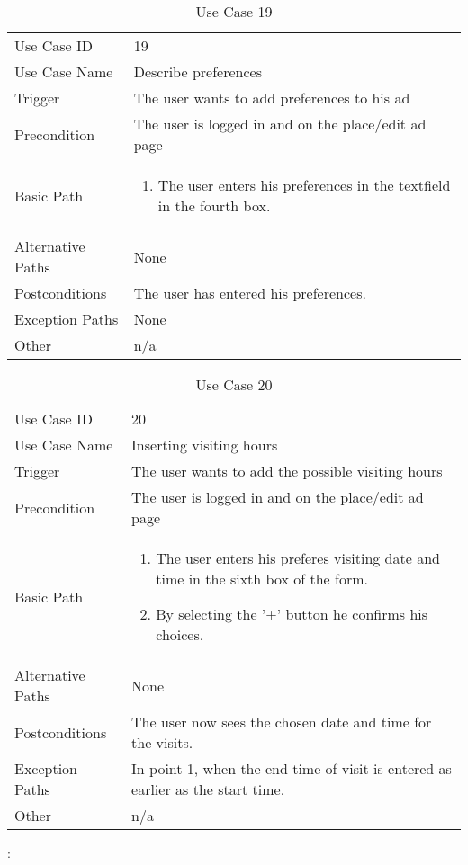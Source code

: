 \begin{table}[H]
\centering
\label{table-use-case-19}
\begin{tabular}{|p{3cm}|p{10cm}}
Use Case ID       & 19                                                      \\
Use Case Name     & Describe preferences                            \\
Trigger           & The user wants to add preferences to his ad\\
Precondition      & The user is logged in and on the place/edit ad page
\\
Basic Path        & \begin{enumerate}
\item		The user enters his preferences in the textfield in the fourth box.
\end{enumerate} 
     \\
Alternative Paths & None                          \\
Postconditions    & The user has entered his preferences.\\
Exception Paths   & None			\\
Other             & n/a                                                                                                                                                                                                        
\end{tabular}
\caption{Use Case 19}
\end{table}

\begin{table}[H]
\centering
\label{table-use-case-20}
\begin{tabular}{|p{3cm}|p{10cm}}
Use Case ID       & 20                                                      \\
Use Case Name     & Inserting visiting hours                            \\
Trigger           & The user wants to add the possible visiting hours \\
Precondition      & The user is logged in and on the place/edit ad page
\\
Basic Path        & \begin{enumerate}
\item		The user enters his preferes visiting date and time in the sixth box of
the form.
\item  		By selecting the '+' button he confirms his choices.
\end{enumerate} 
     \\
Alternative Paths & None                          \\
Postconditions    & The user now sees the chosen date and time for the visits.
\\
Exception Paths   & In point 1, when the end time of visit is entered as earlier
as the start time.
\\
Other             & n/a                                                                                                                                                                                                        
\end{tabular}
\caption{Use Case 20}:
\end{table}

